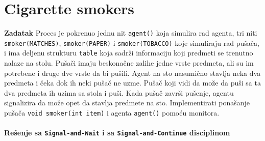 \clearpage
\section{Cigarette smokers}
\textbf{\large Zadatak} Proces je pokrenuo jednu nit \texttt{agent()} koja simulira rad agenta, tri niti \texttt{smoker(MATCHES)}, \texttt{smoker(PAPER)} i \texttt{smoker(TOBACCO)} koje simuliraju rad pu\v{s}a\v{c}a, i ima deljenu strukturu \texttt{table} koja sadr\v{z}i informaciju koji predmeti se trenutno nalaze na stolu. Pu\v{s}a\v{c}i imaju beskona\v{c}ne zalihe jedne vrste predmeta, ali su im potrebene i druge dve vrste da bi pu\v{s}ili. Agent na sto nasumi\v{c}no stavlja neka dva  predmeta i \v{c}eka dok ih neki pu\v{s}a\v{c} ne uzme. Pu\v{s}a\v{c} koji vidi da mo\v{z}e da pu\v{s}i sa ta dva predmeta ih uzima sa stola i pu\v{s}i. Kada pu\v{s}a\v{c} zavr\v{s}i pu\v{s}enje, agentu signalizira da mo\v{z}e opet da stavlja predmete na sto. Implementirati pona\v{s}anje pu\v{s}a\v{c}a \texttt{void smoker(int item)} i agenta \texttt{agent()} pomo\'{c}u monitora.
\\\\
\textbf{Re\v{s}enje sa \texttt{Signal-and-Wait} i sa \texttt{Signal-and-Continue} disciplinom}
